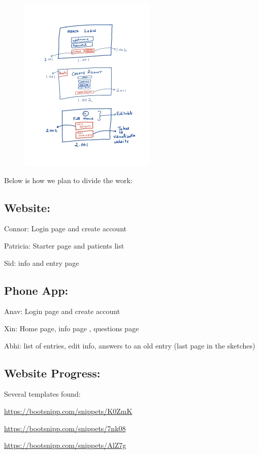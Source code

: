 \documentclass[]{book}
\begin{document}
\begin{figure}
\centering
\includegraphics{images/page1_001.jpg}
\caption{}
\end{figure}

Below is how we plan to divide the work:

\subsection{Website:}\label{website}

Connor: Login page and create account

Patricia: Starter page and patients list

Sid: info and entry page

\subsection{Phone App:}\label{phone-app}

Anav: Login page and create account

Xin: Home page, info page , questions page

Abhi: list of entries, edit info, answers to an old entry (last page in
the sketches)

\subsection{Website Progress:}\label{website-progress}

Several templates found:

\url{https://bootsnipp.com/snippets/K0ZmK}

\url{https://bootsnipp.com/snippets/7nk08}

\url{https://bootsnipp.com/snippets/AlZ7g}
\end{document}
